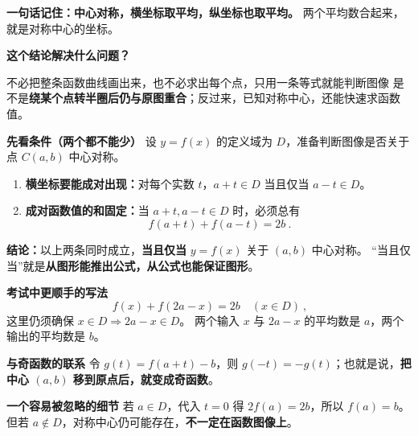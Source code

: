 \begin{statementbox}


\textbf{一句话记住：中心对称，横坐标取平均，纵坐标也取平均。}
两个平均数合起来，就是对称中心的坐标。

\textbf{\textcolor{CStatement}{这个结论解决什么问题？}}

不必把整条函数曲线画出来，也不必求出每个点，只用一条等式就能判断图像
是不是\textbf{绕某个点转半圈后仍与原图重合}；反过来，已知对称中心，还能快速求函数值。

\medskip
\textbf{\textcolor{CStatement}{先看条件（两个都不能少）}}
设 $y=f(x)$ 的定义域为 $D$，准备判断图像是否关于点 $C(a,b)$ 中心对称。
\begin{enumerate}[leftmargin=*,itemsep=0.3em]
  \item \textbf{横坐标要能成对出现：}对每个实数 $t$，$a+t\in D$ 当且仅当 $a-t\in D$。
  \item \textbf{成对函数值的和固定：}当 $a+t,a-t\in D$ 时，必须总有
  \[
     \boxed{\ f(a+t)+f(a-t)=2b\ }.
  \]
\end{enumerate}
\textbf{结论：}以上两条同时成立，\textbf{当且仅当} $y=f(x)$ 关于 $(a,b)$ 中心对称。
“当且仅当”就是\textbf{从图形能推出公式，从公式也能保证图形}。

\medskip
\end{statementbox}\clearpage\begin{statementbox}\textbf{\textcolor{CStatement}{考试中更顺手的写法}}
\[
  \boxed{\ f(x)+f(2a-x)=2b\quad(x\in D)\ },
\]
这里仍须确保 $x\in D\Longrightarrow 2a-x\in D$。
两个输入 $x$ 与 $2a-x$ 的平均数是 $a$，两个输出的平均数是 $b$。

\medskip
\textbf{\textcolor{CStatement}{与奇函数的联系}}
令 $g(t)=f(a+t)-b$，则 $g(-t)=-g(t)$；也就是说，\textbf{把中心 $(a,b)$ 移到原点后，就变成奇函数}。

\medskip
\textbf{\textcolor{CStatement}{一个容易被忽略的细节}}
若 $a\in D$，代入 $t=0$ 得 $2f(a)=2b$，所以 $f(a)=b$。
但若 $a\notin D$，对称中心仍可能存在，\textbf{不一定在函数图像上}。
\end{statementbox}
\clearpage
